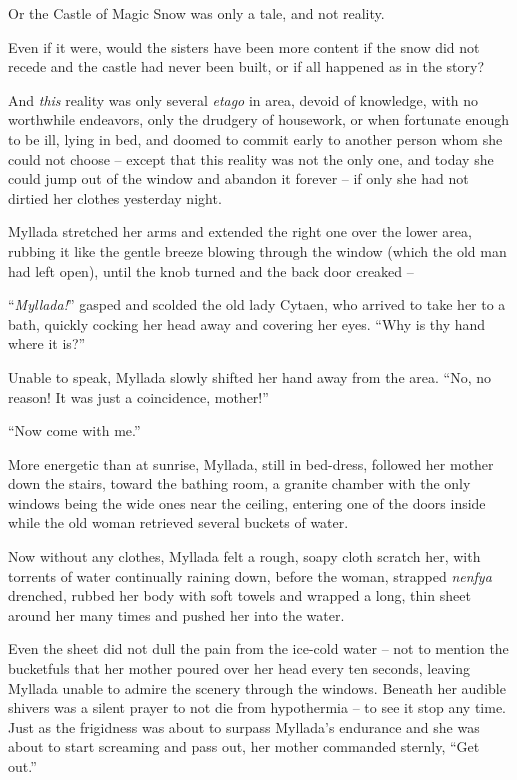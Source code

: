Or the Castle of Magic Snow was only a tale, and not reality.

Even if it were, would the sisters have been more content if the snow did not recede and the castle had never been built, or if all happened as in the story?

And \emph{this} reality was only several \emph{etago} in area, devoid of knowledge, with no worthwhile endeavors, only the drudgery of housework, or when fortunate enough to be ill, lying in bed, and doomed to commit early to another person whom she could not choose -- except that this reality was not the only one, and today she could jump out of the window and abandon it forever -- if only she had not dirtied her clothes yesterday night.

Myllada stretched her arms and extended the right one over the lower area, rubbing it like the gentle breeze blowing through the window (which the old man had left open), until the knob turned and the back door creaked --

``\emph{Myllada!}'' gasped and scolded the old lady Cytaen, who arrived to take her to a bath, quickly cocking her head away and covering her eyes. ``Why is thy hand where it is?''

Unable to speak, Myllada slowly shifted her hand away from the area. ``No, no reason! It was just a coincidence, mother!''

``Now come with me.''

More energetic than at sunrise, Myllada, still in bed-dress, followed her mother down the stairs, toward the bathing room, a granite chamber with the only windows being the wide ones near the ceiling, entering one of the doors inside while the old woman retrieved several buckets of water.

Now without any clothes, Myllada felt a rough, soapy cloth scratch her, with torrents of water continually raining down, before the woman, strapped \emph{nenfya} drenched, rubbed her body with soft towels and wrapped a long, thin sheet around her many times and pushed her into the water.

Even the sheet did not dull the pain from the ice-cold water -- not to mention the bucketfuls that her mother poured over her head every ten seconds, leaving Myllada unable to admire the scenery through the windows. Beneath her audible shivers was a silent prayer to not die from hypothermia -- to see it stop any time. Just as the frigidness was about to surpass Myllada's endurance and she was about to start screaming and pass out, her mother commanded sternly, ``Get out.''

